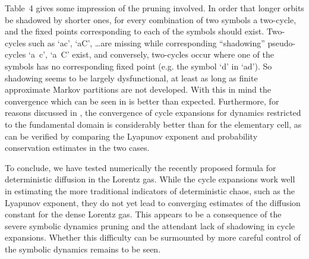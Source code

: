 Table~4 gives some impression of the pruning involved.
In order that longer orbits be shadowed by shorter ones,
for every combination of two symbols a two-cycle,
and the fixed points corresponding to each of the symbols should exist.
Two-cycles such as `ac', `aC', \ldots are missing while
corresponding ``shadowing'' pseudo-cycles `a~c', `a~C' exist, and
conversely, two-cycles occur where one of the symbols
has no corresponding fixed point
(e.g. the symbol `d' in `ad'). So shadowing seems to be largely dysfunctional,
at least as long as finite approximate Markov partitions are
not developed.
With this in mind the convergence which can be seen in
is better than expected. Furthermore, for reasons discussed
in , the convergence of cycle expansions for dynamics
restricted to the fundamental domain is considerably better
than for the elementary cell, as can be verified by comparing
the Lyapunov exponent and probability conservation estimates in
the two cases.


To conclude, we have tested numerically the recently proposed formula
for deterministic diffusion in the Lorentz gas.
While the cycle expansions work well in estimating
the more traditional indicators of deterministic chaos, such as
the Lyapunov exponent, they do not yet lead to converging estimates
of the diffusion constant for the dense Lorentz gas. This appears to
be a consequence of the severe symbolic dynamics pruning and the
attendant lack of shadowing in cycle expansions. Whether this difficulty
can be surmounted by more careful control of the symbolic dynamics
remains to be seen.

